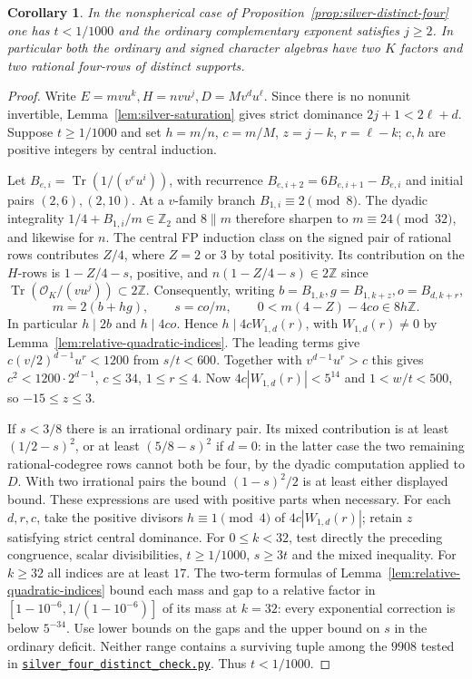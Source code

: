 \documentclass[11pt,reqno]{amsart}
\newcommand{\codefile}[1]{\href{https://github.com/sebastienpalcoux/grothendieck-ring-classification/blob/d5750105bb5758f3ad38d2e5464dfcc12c019816/supplements/rank6/sphericality/#1}{\nolinkurl{#1}}}
\newtheorem{corollary}[theorem]{Corollary}
\theoremstyle{remark}\newtheorem{remark}[theorem]{Remark}
\numberwithin{equation}{section}
\begin{document}
\begin{corollary}\label{cor:silver-distinct-small-mass}
In the nonspherical case of Proposition~\ref{prop:silver-distinct-four}
one has $t<1/1000$ and the ordinary complementary exponent satisfies
$j\ge2$. In particular both the ordinary and signed character algebras
have two $K$ factors and two rational four-rows of distinct supports.
\end{corollary}
\begin{proof}
Write $E=mvu^k,H=nvu^j,D=Mv^d u^\ell$. Since there is no
nonunit invertible, Lemma~\ref{lem:silver-saturation} gives strict
dominance $2j+1<2\ell+d$. Suppose $t\ge1/1000$ and set
$h=m/n$, $c=m/M$, $z=j-k$, $r=\ell-k$; $c,h$ are positive
integers by central induction.

Let $B_{e,i}=\operatorname{Tr}(1/(v^eu^i))$, with recurrence
$B_{e,i+2}=6B_{e,i+1}-B_{e,i}$ and initial pairs $(2,6),(2,10)$.
At a $v$-family branch $B_{1,i}\equiv2\pmod8$. The dyadic
integrality $1/4+B_{1,i}/m\in\mathbb Z_2$ and $8\parallel m$
therefore sharpen to $m\equiv24\pmod{32}$, and likewise for $n$.
The central FP induction class on the signed pair of rational rows
contributes $Z/4$, where $Z=2$ or $3$ by total positivity.
Its contribution on the $H$-rows is $1-Z/4-s$, positive, and
$n(1-Z/4-s)\in2\mathbb Z$ since
$\operatorname{Tr}(\mathcal O_K/(vu^j))\subset2\mathbb Z$.
Consequently, writing $b=B_{1,k},g=B_{1,k+z},o=B_{d,k+r}$,
\[
 m=2(b+hg),\qquad s=co/m,\qquad
 0<m(4-Z)-4co\in8h\mathbb Z .
\]
In particular $h\mid2b$ and $h\mid4co$. Hence $h\mid4cW_{1,d}(r)$, with $W_{1,d}(r)\ne0$ by
Lemma~\ref{lem:relative-quadratic-indices}. The leading terms
give $c(v/2)^{d-1}u^r<1200$ from $s/t<600$. Together with
$v^{d-1}u^r>c$ this gives $c^2<1200\cdot2^{d-1}$, $c\le34$,
$1\le r\le4$. Now $4c|W_{1,d}(r)|<5^{14}$ and $1<w/t<500$,
so $-15\le z\le3$.

If $s<3/8$ there is
an irrational ordinary pair. Its mixed contribution is at least
$(1/2-s)^2$, or at least $(5/8-s)^2$ if $d=0$: in the latter
case the two remaining rational-codegree rows cannot both be four,
by the dyadic computation applied to $D$. With two irrational
pairs the bound $(1-s)^2/2$ is at least either displayed bound.
These expressions are used with positive parts when necessary.
For each $d,r,c$, take the positive divisors $h\equiv1\pmod4$ of
$4c|W_{1,d}(r)|$; retain $z$ satisfying strict central dominance.
For $0\le k<32$, test directly the preceding congruence, scalar
divisibilities, $t\ge1/1000$, $s\ge3t$ and the mixed inequality.
For $k\ge32$ all indices are at least $17$. The two-term formulas
of Lemma~\ref{lem:relative-quadratic-indices} bound each mass
and gap to a relative factor in $[1-10^{-6},1/(1-10^{-6})]$
of its mass at $k=32$: every exponential correction is below $5^{-34}$.
Use lower bounds on the gaps and the upper bound on $s$ in the ordinary
deficit. Neither range contains a surviving tuple among the $9908$
tested in \codefile{silver_four_distinct_check.py}. Thus $t<1/1000$.


\end{proof}
\end{document}
